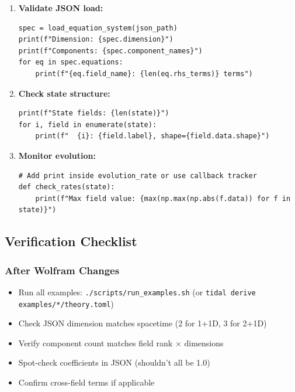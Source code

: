 \begin{enumerate}
  \item \textbf{Validate JSON load:}

\begin{lstlisting}[style=python]
spec = load_equation_system(json_path)
print(f"Dimension: {spec.dimension}")
print(f"Components: {spec.component_names}")
for eq in spec.equations:
    print(f"{eq.field_name}: {len(eq.rhs_terms)} terms")
\end{lstlisting}

  \item \textbf{Check state structure:}

\begin{lstlisting}[style=python]
print(f"State fields: {len(state)}")
for i, field in enumerate(state):
    print(f"  {i}: {field.label}, shape={field.data.shape}")
\end{lstlisting}

  \item \textbf{Monitor evolution:}

\begin{lstlisting}[style=python]
# Add print inside evolution_rate or use callback tracker
def check_rates(state):
    print(f"Max field value: {max(np.max(np.abs(f.data)) for f in state)}")
\end{lstlisting}
\end{enumerate}


\subsection{Verification Checklist}
\label{sec:verification-checklist}

\subsubsection{After Wolfram Changes}

\begin{itemize}
  \item Run all examples: \texttt{./scripts/run\_examples.sh} (or \texttt{tidal derive examples/*/theory.toml})
  \item Check JSON dimension matches spacetime (2 for 1+1D, 3 for 2+1D)
  \item Verify component count matches field rank $\times$ dimensions
  \item Spot-check coefficients in JSON (shouldn't all be 1.0)
  \item Confirm cross-field terms if applicable
\end{itemize}

